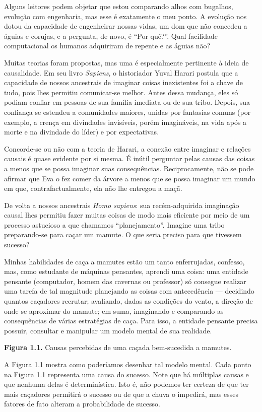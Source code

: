 \documentclass[11pt,a5paper,twoside]{book}
\begin{document}
Alguns leitores podem objetar que estou comparando alhos com bugalhos, evolução com engenharia, mas esse é exatamente o meu ponto. A evolução nos dotou da capacidade de engenheirar nossas vidas, um dom que não concedeu a águias e corujas, e a pergunta, de novo, é “Por quê?”. Qual facilidade computacional os humanos adquiriram de repente e as águias não?

Muitas teorias foram propostas, mas uma é especialmente pertinente à ideia de causalidade. Em seu livro \textit{Sapiens}, o historiador Yuval Harari postula que a capacidade de nossos ancestrais de imaginar coisas inexistentes foi a chave de tudo, pois lhes permitiu comunicar-se melhor. Antes dessa mudança, eles só podiam confiar em pessoas de sua família imediata ou de sua tribo. Depois, sua confiança se estendeu a comunidades maiores, unidas por fantasias comuns (por exemplo, a crença em divindades invisíveis, porém imagináveis, na vida após a morte e na divindade do líder) e por expectativas.

Concorde-se ou não com a teoria de Harari, a conexão entre imaginar e relações causais é quase evidente por si mesma. É inútil perguntar pelas causas das coisas a menos que se possa imaginar suas consequências. Reciprocamente, não se pode afirmar que Eva o fez comer da árvore a menos que se possa imaginar um mundo em que, contrafactualmente, ela não lhe entregou a maçã.

De volta a nossos ancestrais \textit{Homo sapiens}: sua recém-adquirida imaginação causal lhes permitiu fazer muitas coisas de modo mais eficiente por meio de um processo astucioso a que chamamos “planejamento”. Imagine uma tribo preparando-se para caçar um mamute. O que seria preciso para que tivessem sucesso?

Minhas habilidades de caça a mamutes estão um tanto enferrujadas, confesso, mas, como estudante de máquinas pensantes, aprendi uma coisa: uma entidade pensante (computador, homem das cavernas ou professor) só consegue realizar uma tarefa de tal magnitude planejando as coisas com antecedência — decidindo quantos caçadores recrutar; avaliando, dadas as condições do vento, a direção de onde se aproximar do mamute; em suma, imaginando e comparando as consequências de várias estratégias de caça. Para isso, a entidade pensante precisa possuir, consultar e manipular um modelo mental de sua realidade.

\textbf{Figura 1.1.} Causas percebidas de uma caçada bem-sucedida a mamutes.

A Figura 1.1 mostra como poderíamos desenhar tal modelo mental. Cada ponto na Figura 1.1 representa uma causa do sucesso. Note que há múltiplas causas e que nenhuma delas é determinística. Isto é, não podemos ter certeza de que ter mais caçadores permitirá o sucesso ou de que a chuva o impedirá, mas esses fatores de fato alteram a probabilidade de sucesso.
\end{document}
